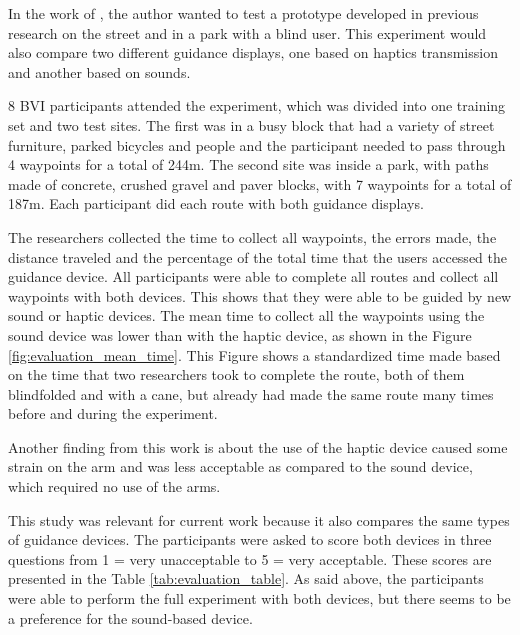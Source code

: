 In the work of \cite{marston2006evaluation}, the author wanted to test a prototype developed in previous research on the street and in a park with a blind user. This experiment would also compare two different guidance displays, one based on haptics transmission and another based on sounds.

8 BVI participants attended the experiment, which was divided into one training set and two test sites. The first was in a busy block that had a variety of street furniture, parked bicycles and people and the participant needed to pass through 4 waypoints for a total of 244m. The second site was inside a park, with paths made of concrete, crushed gravel and paver blocks, with 7 waypoints for a total of 187m. Each participant did each route with both guidance displays.

The researchers collected the time to collect all waypoints, the errors made, the distance traveled and the percentage of the total time that the users accessed the guidance device. All participants were able to complete all routes and collect all waypoints with both devices. This shows that they were able to be guided by new sound or haptic devices. The mean time to collect all the waypoints using the sound device was lower than with the haptic device, as shown in the Figure \ref{fig:evaluation_mean_time}. This Figure shows a standardized time made based on the time that two researchers took to complete the route, both of them blindfolded and with a cane, but already had made the same route many times before and during the experiment.




Another finding from this work is about the use of the haptic device caused some strain on the arm and was less acceptable as compared to the sound device, which required no use of the arms.

This study was relevant for current work because it also compares the same types of guidance devices. The participants were asked to score both devices in three questions from 1 = very unacceptable to 5 = very acceptable. These scores are presented in the Table \ref{tab:evaluation_table}. As said above, the participants were able to perform the full experiment with both devices, but there seems to be a preference for the sound-based device.

